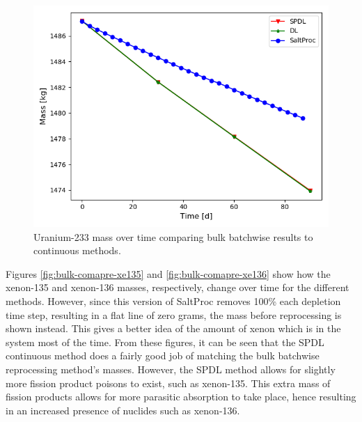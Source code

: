 \begin{figure}[H]
  \centering
  \includegraphics[scale=0.7]{images/soln-3-U233.png}
  \caption{Uranium-233 mass over time comparing bulk batchwise results to continuous methods.}
   \label{fig:bulk-comapre-u233}
\end{figure}

Figures \ref{fig:bulk-comapre-xe135} and \ref{fig:bulk-comapre-xe136} show how the xenon-135 and xenon-136 masses, respectively, change over time for the different methods. However, since this version of SaltProc removes 100\% each depletion time step, resulting in a flat line of zero grams, the mass before reprocessing is shown instead. This gives a better idea of the amount of xenon which is in the system most of the time. From these figures, it can be seen that the SPDL continuous method does a fairly good job of matching the bulk batchwise reprocessing method's masses.
However, the SPDL method allows for slightly more fission product poisons to exist, such as xenon-135. This extra mass of fission products allows for more parasitic absorption to take place, hence resulting in an increased presence of nuclides such as xenon-136.

